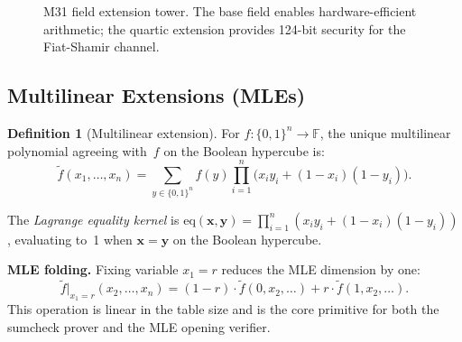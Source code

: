 \documentclass[10pt,twocolumn]{article}
\theoremstyle{definition}
\newtheorem{definition}[theorem]{Definition}
\theoremstyle{remark}
\newcommand{\F}{\mathbb{F}}
\newcommand{\M}{\mathrm{M31}}
\newcommand{\CM}{\mathrm{CM31}}
\newcommand{\QM}{\mathrm{QM31}}
\newcommand{\eq}{\mathrm{eq}}
\newcommand{\MLE}{\widetilde}
\begin{document}
\begin{figure}[t]
  \centering
  \caption{M31 field extension tower. The base field enables hardware-efficient
           arithmetic; the quartic extension provides 124-bit security for
           the Fiat-Shamir channel.}
  \label{fig:tower}
\end{figure}

\subsection{Multilinear Extensions (MLEs)}

\begin{definition}[Multilinear extension]
For $f:\{0,1\}^n\to\F$, the unique multilinear polynomial agreeing
with~$f$ on the Boolean hypercube is:
\begin{equation}\label{eq:mle}
  \MLE{f}(x_1,\ldots,x_n)
  = \sum_{y\in\{0,1\}^n} f(y)\prod_{i=1}^{n}
    \bigl(x_i y_i + (1\!-\!x_i)(1\!-\!y_i)\bigr).
\end{equation}
\end{definition}

The \emph{Lagrange equality kernel} is
$\eq(\mathbf{x},\mathbf{y}) = \prod_{i=1}^n (x_i y_i + (1-x_i)(1-y_i))$,
evaluating to~1 when $\mathbf{x}=\mathbf{y}$ on the Boolean hypercube.

\textbf{MLE folding.}
Fixing variable $x_1=r$ reduces the MLE dimension by one:
\begin{equation}\label{eq:fold}
  \MLE{f}|_{x_1=r}(x_2,\ldots,x_n)
  = (1-r)\cdot\MLE{f}(0,x_2,\ldots) + r\cdot\MLE{f}(1,x_2,\ldots).
\end{equation}
This operation is linear in the table size and is the core primitive
for both the sumcheck prover and the MLE opening verifier.
\end{document}
